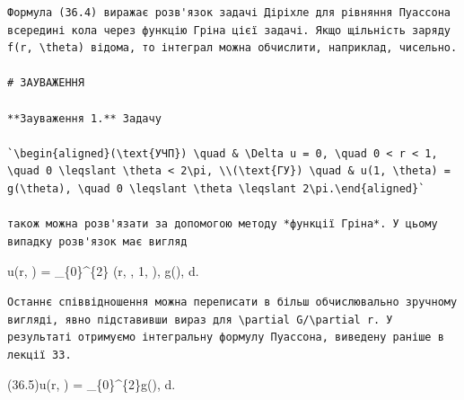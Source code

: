 \documentclass[
  ukrainian,
]{article}
\begin{document}
\begin{verbatim}
Формула (36.4) виражає розв'язок задачі Діріхле для рівняння Пуассона всередині кола через функцію Гріна цієї задачі. Якщо щільність заряду f(r, \theta) відома, то інтеграл можна обчислити, наприклад, чисельно.

# ЗАУВАЖЕННЯ

**Зауваження 1.** Задачу

`\begin{aligned}(\text{УЧП}) \quad & \Delta u = 0, \quad 0 < r < 1, \quad 0 \leqslant \theta < 2\pi, \\(\text{ГУ}) \quad & u(1, \theta) = g(\theta), \quad 0 \leqslant \theta \leqslant 2\pi.\end{aligned}`

також можна розв'язати за допомогою методу *функції Гріна*. У цьому випадку розв'язок має вигляд
\end{verbatim}

u(r, \theta) = \int\_\{0\}\^{}\{2\pi\} (r,
\theta, 1, \varphi), g(\varphi), d\varphi.

\begin{verbatim}
Останнє співвідношення можна переписати в більш обчислювально зручному вигляді, явно підставивши вираз для \partial G/\partial r. У результаті отримуємо інтегральну формулу Пуассона, виведену раніше в лекції 33.
\end{verbatim}

(36.5)\qquad u(r, \theta) = 
\int\_\{0\}\^{}\{2\pi\} g(\varphi),
d\varphi.
\end{document}
